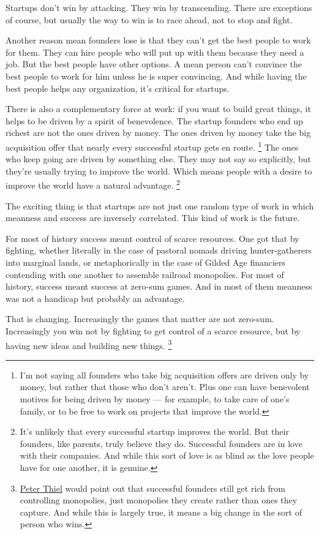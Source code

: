 \documentclass[12pt]{book}
\begin{document}
Startups don't win by attacking. They win by transcending. There are
exceptions of course, but usually the way to win is to race ahead, not
to stop and fight.

Another reason mean founders lose is that they can't get the best people
to work for them. They can hire people who will put up with them because
they need a job. But the best people have other options. A mean person
can't convince the best people to work for him unless he is super
convincing. And while having the best people helps any organization,
it's critical for startups.

There is also a complementary force at work: if you want to build great
things, it helps to be driven by a spirit of benevolence. The startup
founders who end up richest are not the ones driven by money. The ones
driven by money take the big acquisition offer that nearly every
successful startup gets en route. \footnote{I'm not saying all founders who take big acquisition offers are
driven only by money, but rather that those who don't aren't. Plus one
can have benevolent motives for being driven by money --- for example,
to take care of one's family, or to be free to work on projects that
improve the world.} The ones who
keep going are driven by something else. They may not say so explicitly,
but they're usually trying to improve the world. Which means people with
a desire to improve the world have a natural advantage.
\footnote{It's unlikely that every successful startup improves the world.
But their founders, like parents, truly believe they do. Successful
founders are in love with their companies. And while this sort of love
is as blind as the love people have for one another, it is genuine.}

The exciting thing is that startups are not just one random type of work
in which meanness and success are inversely correlated. This kind of
work is the future.

For most of history success meant control of scarce resources. One got
that by fighting, whether literally in the case of pastoral nomads
driving hunter-gatherers into marginal lands, or metaphorically in the
case of Gilded Age financiers contending with one another to assemble
railroad monopolies. For most of history, success meant success at
zero-sum games. And in most of them meanness was not a handicap but
probably an advantage.

That is changing. Increasingly the games that matter are not zero-sum.
Increasingly you win not by fighting to get control of a scarce
resource, but by having new ideas and building new things.
\footnote{\href{http://startupclass.samaltman.com/courses/lec05}{Peter
Thiel} would point out that successful founders still get rich from
controlling monopolies, just monopolies they create rather than ones
they capture. And while this is largely true, it means a big change in
the sort of person who wins.}
\end{document}
